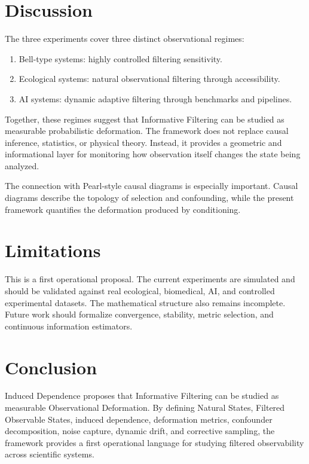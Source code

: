 \documentclass[11pt]{article}
\begin{document}
\section{Discussion}

The three experiments cover three distinct observational regimes:

\begin{enumerate}
\item Bell-type systems: highly controlled filtering sensitivity.
\item Ecological systems: natural observational filtering through accessibility.
\item AI systems: dynamic adaptive filtering through benchmarks and pipelines.
\end{enumerate}

Together, these regimes suggest that Informative Filtering can be studied as measurable probabilistic deformation. The framework does not replace causal inference, statistics, or physical theory. Instead, it provides a geometric and informational layer for monitoring how observation itself changes the state being analyzed.

The connection with Pearl-style causal diagrams is especially important. Causal diagrams describe the topology of selection and confounding, while the present framework quantifies the deformation produced by conditioning.

\section{Limitations}

This is a first operational proposal. The current experiments are simulated and should be validated against real ecological, biomedical, AI, and controlled experimental datasets. The mathematical structure also remains incomplete. Future work should formalize convergence, stability, metric selection, and continuous information estimators.

\section{Conclusion}

Induced Dependence proposes that Informative Filtering can be studied as measurable Observational Deformation. By defining Natural States, Filtered Observable States, induced dependence, deformation metrics, confounder decomposition, noise capture, dynamic drift, and corrective sampling, the framework provides a first operational language for studying filtered observability across scientific systems.
\end{document}
